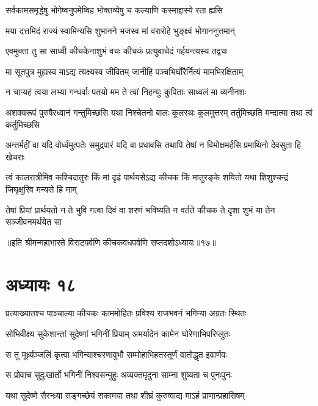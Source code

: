 \twolineshloka
{सर्वकामसमृद्धेषु भोगेष्वनुपमेष्विह}
{भोक्तव्येषु च कल्याणि कस्माद्दास्ये रता ह्यसि}


\twolineshloka
{मया दत्तमिदं राज्यं स्वामिन्यसि शुभानने}
{भजस्व मां वरारोहे भुङ्क्ष्वं भोगाननुत्तमान्}


\twolineshloka
{एवमुक्ता तु सा साध्वी कीचकेनाशुभं वचः}
{कीचकं प्रत्युवाचेदं गर्हयन्त्यस्य तद्वचः}




\twolineshloka
{मा सूतपुत्र मुह्यस्व माऽद्य त्यक्ष्यस्व जीवितम्}
{जानीहि पञ्चभिर्घोरैर्नित्यं मामभिरक्षिताम्}


\twolineshloka
{न चाप्यहं त्वया लभ्या गन्धर्वाः पतयो मम}
{ते त्वां निहन्युः कुपिताः साध्वलं मा व्यनीनशः}


\onelineshloka
{अशक्यरूपं पुरुषैरध्वानं गन्तुमिच्छसि}
\twolineshloka
{यथा निश्चेतनो बालः कूलस्थः कूलमुत्तरम्}
{तर्तुमिच्छति मन्दात्मा तथा त्वं कर्तुमिच्छसि}


\twolineshloka
{अन्तर्महीं वा यदि वोर्ध्वमुत्पतेः समुद्रपारं यदि वा प्रधावसि}
{तथापि तेषां न विमोक्षमर्हसि प्रमाथिनो देवसुता हि खेचराः}


\twolineshloka
{त्वं कालरात्रीमिव कश्चिदातुरः किं मां दृढं पार्थयसेऽद्य कीचक}
{किं मातुरङ्के शयितो यथा शिशुश्चन्द्रं जिघृक्षुरिव मन्यसे हि माम्}


\twolineshloka
{तेषां प्रियां प्रार्थयतो न ते भुवि गत्वा दिवं वा शरणं भविष्यति}
{न वर्तते कीचक ते दृशा शुभं या तेन सञ्जीवनमर्थयेत सा}

॥इति श्रीमन्महाभारते विराटपर्वणि कीचकवधपर्वणि सप्तदशोऽध्यायः॥१७॥

\chapter{अध्यायः १८}

\twolineshloka
{प्रत्याख्यातश्च पाञ्चाल्या कीचकः काममोहितः}
{प्रविश्य राजभवनं भगिन्या अग्रतः स्थितः}


\twolineshloka
{सोभिवीक्ष्य सुकेशान्तां सुदेष्णां भगिनीं प्रियाम्}
{अमर्यादेन कामेन घोरेणाभिपरिप्लुतः}


\twolineshloka
{स तु मूर्ध्र्यञ्जलिं कृत्वा भगिन्याश्चरणावुभौ}
{सम्मोहाभिहतस्तूर्णं वातोद्धृत इवार्णवः}


\twolineshloka
{स प्रोवाच सुदुःखार्तो भगिनीं निश्वसन्मुहुः}
{अव्यक्तमृदुना साम्ना शुष्यता च पुनःपुनः}


\twolineshloka
{यथा सुदेष्णे सैरन्ध्र्या सङ्गच्छेयं सकामया}
{तथा शीघ्रं कुरुष्वाद्य माऽहं प्राणान्प्रहासिषम्}


